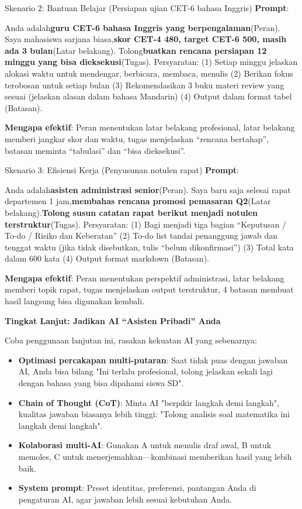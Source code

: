 \begin{tcbinfo}{Skenario 2: Bantuan Belajar (Persiapan ujian CET-6 bahasa Inggris)}
\textbf{Prompt}:

Anda adalah\textbf{guru CET-6 bahasa Inggris yang berpengalaman}(Peran). Saya mahasiswa sarjana biasa,\textbf{skor CET-4 480, target CET-6 500, masih ada 3 bulan}(Latar belakang). Tolong\textbf{buatkan rencana persiapan 12 minggu yang bisa dieksekusi}(Tugas). Persyaratan: (1) Setiap minggu jelaskan alokasi waktu untuk mendengar, berbicara, membaca, menulis (2) Berikan fokus terobosan untuk setiap bulan (3) Rekomendasikan 3 buku materi review yang sesuai (jelaskan alasan dalam bahasa Mandarin) (4) Output dalam format tabel (Batasan).

\textbf{Mengapa efektif}: Peran menentukan latar belakang profesional, latar belakang memberi jangkar skor dan waktu, tugas menjelaskan “rencana bertahap”, batasan meminta “tabulasi” dan “bisa dieksekusi”.

\end{tcbinfo}

\begin{tcbinfo}{Skenario 3: Efisiensi Kerja (Penyusunan notulen rapat)}
\textbf{Prompt}:

Anda adalah\textbf{asisten administrasi senior}(Peran). Saya baru saja selesai rapat departemen 1 jam,\textbf{membahas rencana promosi pemasaran Q2}(Latar belakang).\textbf{Tolong susun catatan rapat berikut menjadi notulen terstruktur}(Tugas). Persyaratan: (1) Bagi menjadi tiga bagian “Keputusan / To-do / Risiko dan Keberatan” (2) To-do list tandai penanggung jawab dan tenggat waktu (jika tidak disebutkan, tulis “belum dikonfirmasi”) (3) Total kata dalam 600 kata (4) Output format markdown (Batasan).

\textbf{Mengapa efektif}: Peran menentukan perspektif administrasi, latar belakang memberi topik rapat, tugas menjelaskan output terstruktur, 4 batasan membuat hasil langsung bisa digunakan kembali.

\end{tcbinfo}

\textbf{Tingkat Lanjut: Jadikan AI “Asisten Pribadi” Anda}\par

Coba penggunaan lanjutan ini, rasakan kekuatan AI yang sebenarnya:

\begin{itemize}
  \item \textbf{Optimasi percakapan multi-putaran}: Saat tidak puas dengan jawaban AI, Anda bisa bilang "Ini terlalu profesional, tolong jelaskan sekali lagi dengan bahasa yang bisa dipahami siswa SD".
  \item \textbf{Chain of Thought (CoT)}: Minta AI "berpikir langkah demi langkah", kualitas jawaban biasanya lebih tinggi: "Tolong analisis soal matematika ini langkah demi langkah".
  \item \textbf{Kolaborasi multi-AI}: Gunakan A untuk menulis draf awal, B untuk memoles, C untuk menerjemahkan—kombinasi memberikan hasil yang lebih baik.
  \item \textbf{System prompt}: Preset identitas, preferensi, pantangan Anda di pengaturan AI, agar jawaban lebih sesuai kebutuhan Anda.
\end{itemize}

